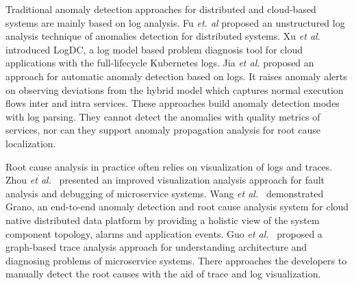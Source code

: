 
Traditional anomaly detection approaches for distributed and cloud-based systems are mainly based on log analysis.
Fu \emph{et. al}\cite{09ICDM_EADULA}  proposed an unstructured log analysis technique of anomalies detection for distributed systems. 
Xu \emph{et al.}\cite{17ICEBE_LogDC} introduced LogDC, a log model based problem diagnosis tool for cloud applications with the full-lifecycle Kubernetes logs.
Jia \emph{et al.}\cite{17ICWS_ADHGML} proposed an approach for automatic anomaly detection based on logs. It raises anomaly alerts on observing deviations from the hybrid model which captures normal execution flows inter and intra services.
These approaches build anomaly detection modes with log parsing.
They cannot detect the anomalies with quality metrics of services, nor can they support anomaly propagation analysis for root cause localization.

Root cause analysis in practice often relies on visualization of logs and traces.
Zhou \emph{et al.}~\cite{Zhou_TSE18MS} presented an improved visualization analysis approach for fault analysis and debugging of microservice systems.
Wang \emph{et al.}~\cite{Hanzhang_GraphBased2019} demonstrated Grano, an end-to-end anomaly detection and root cause analysis system for cloud native distributed data platform by providing a holistic view of the system component topology, alarms and application events.
Guo \emph{et al.}~\cite{Guo_FSE20Industry} proposed a graph-based trace analysis approach for understanding architecture and diagnosing problems of microservice systems.
There approaches the developers to manually detect the root causes with the aid of trace and log visualization.

